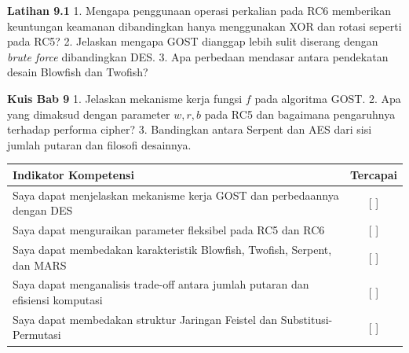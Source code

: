 \documentclass[../main.tex]{subfiles}
\begin{document}
\begin{obereflection}
\textbf{Latihan 9.1}
1. Mengapa penggunaan operasi perkalian pada RC6 memberikan keuntungan keamanan dibandingkan hanya menggunakan XOR dan rotasi seperti pada RC5?
2. Jelaskan mengapa GOST dianggap lebih sulit diserang dengan \textit{brute force} dibandingkan DES.
3. Apa perbedaan mendasar antara pendekatan desain Blowfish dan Twofish?
\end{obereflection}

\begin{obeassessment}
\textbf{Kuis Bab 9}
1. Jelaskan mekanisme kerja fungsi $f$ pada algoritma GOST.
2. Apa yang dimaksud dengan parameter $w, r, b$ pada RC5 dan bagaimana pengaruhnya terhadap performa cipher?
3. Bandingkan antara Serpent dan AES dari sisi jumlah putaran dan filosofi desainnya.
\end{obeassessment}

\begin{competencychecklist}
\begin{tabularx}{\linewidth}{|X|c|}
\hline
Indikator Kompetensi & Tercapai \\
\hline
Saya dapat menjelaskan mekanisme kerja GOST dan perbedaannya dengan DES & [ ] \\
\hline
Saya dapat menguraikan parameter fleksibel pada RC5 dan RC6 & [ ] \\
\hline
Saya dapat membedakan karakteristik Blowfish, Twofish, Serpent, dan MARS & [ ] \\
\hline
Saya dapat menganalisis trade-off antara jumlah putaran dan efisiensi komputasi & [ ] \\
\hline
Saya dapat membedakan struktur Jaringan Feistel dan Substitusi-Permutasi & [ ] \\
\hline
\end{tabularx}
\end{competencychecklist}
\end{document}
